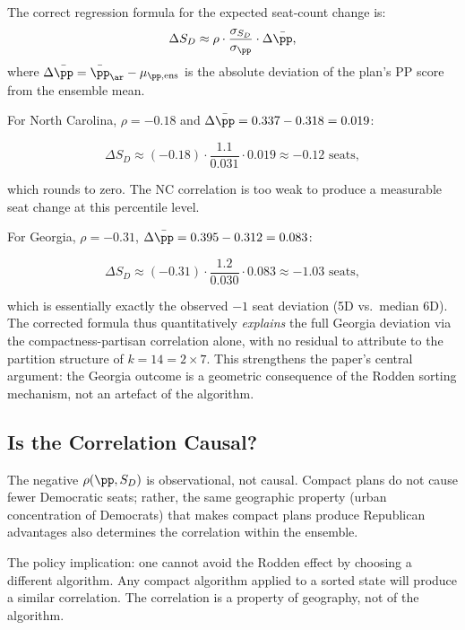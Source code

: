 The correct regression formula for the expected seat-count change is:
\begin{equation}
  \Delta S_D \approx \rho \cdot \frac{\sigma_{S_D}}{\sigma_\pp} \cdot \Delta\bar\pp,
  \label{eq:delta-seats}
\end{equation}
where $\Delta\bar\pp = \bar\pp_{\ar} - \mu_{\pp,\rm ens}$ is the absolute
deviation of the \ar{} plan's PP score from the ensemble mean.

For North Carolina, $\rho = -0.18$ and
$\Delta\bar\pp = 0.337 - 0.318 = 0.019$:

\begin{equation}
  \Delta S_D \approx (-0.18) \cdot \frac{1.1}{0.031} \cdot 0.019 \approx -0.12 \text{ seats},
\end{equation}

which rounds to zero.  The NC correlation is too weak to produce a
measurable seat change at this percentile level.

For Georgia, $\rho = -0.31$,
$\Delta\bar\pp = 0.395 - 0.312 = 0.083$:

\begin{equation}
  \Delta S_D \approx (-0.31) \cdot \frac{1.2}{0.030} \cdot 0.083 \approx -1.03 \text{ seats},
\end{equation}

which is essentially exactly the observed $-1$ seat deviation (5D vs.\ median
6D).  The corrected formula thus quantitatively \emph{explains} the full Georgia
deviation via the compactness-partisan correlation alone, with no residual to
attribute to the partition structure of $k = 14 = 2 \times 7$.  This
strengthens the paper's central argument: the Georgia outcome is a geometric
consequence of the Rodden sorting mechanism, not an artefact of the algorithm.

\subsection{Is the Correlation Causal?}

The negative $\rho(\pp, S_D)$ is observational, not causal.  Compact plans
do not cause fewer Democratic seats; rather, the same geographic property
(urban concentration of Democrats) that makes compact plans produce Republican
advantages also determines the correlation within the ensemble.

The policy implication: one cannot avoid the Rodden effect by choosing a
different algorithm.  Any compact algorithm applied to a sorted state will
produce a similar correlation.  The correlation is a property of geography,
not of the \ar{} algorithm.
